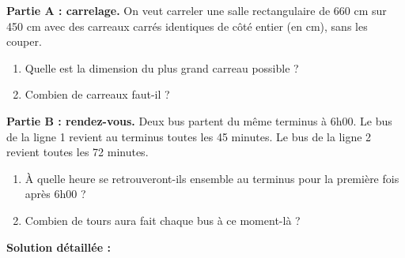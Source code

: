 \documentclass[11pt]{article}
\begin{document}
\begin{exoresolu}
\textbf{Partie A : carrelage.} On veut carreler une salle rectangulaire de \num{660} cm sur \num{450} cm avec des carreaux carrés identiques de côté entier (en cm), sans les couper.
\begin{enumerate}
    \item Quelle est la dimension du plus grand carreau possible ?
    \item Combien de carreaux faut-il ?
\end{enumerate}
\textbf{Partie B : rendez-vous.} Deux bus partent du même terminus à 6h00. Le bus de la ligne 1 revient au terminus toutes les \num{45} minutes. Le bus de la ligne 2 revient toutes les \num{72} minutes.
\begin{enumerate}
    \item À quelle heure se retrouveront-ils ensemble au terminus pour la première fois après 6h00 ?
    \item Combien de tours aura fait chaque bus à ce moment-là ?
\end{enumerate}
\tcblower
\textbf{Solution détaillée :}


\end{exoresolu}
\end{document}
